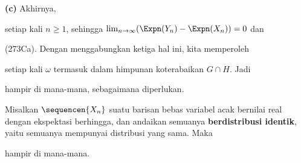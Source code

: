 {{\bf (c)} Akhirnya,


\noindent setiap kali $n\ge 1$, sehingga
$\lim_{n\to\infty}(\Expn(Y_n)-\Expn(X_n))=0$ dan


\noindent (273Ca). Dengan menggabungkan ketiga hal ini, kita memperoleh


\noindent setiap kali $\omega$ termasuk dalam himpunan koterabaikan
$G\cap H$. Jadi


\noindent hampir di mana-mana, sebagaimana diperlukan.
}%

 Misalkan
$\sequencen{X_n}$ suatu barisan bebas variabel acak bernilai real dengan
ekspektasi berhingga, dan andaikan semuanya {\bf berdistribusi identik},
yaitu semuanya mempunyai distribusi yang sama. Maka


\noindent hampir di mana-mana.

